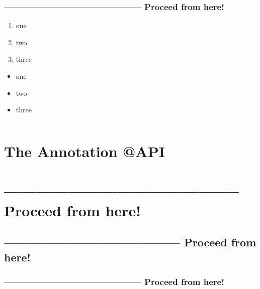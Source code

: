 \subsubsection{-------------------------------------------- Proceed from here!}
\lipsum[1]

\begin{enumerate}[label=P\arabic*.]
\item{one}
\item{two}
\item{three}
\end{enumerate}

\begin{itemize}[nosep]
\item{one}
\item{two}
\item{three}
\end{itemize}

\begin{lstlisting}[numbers=left]
\end{lstlisting}



\section{The Annotation @API}\label{sec:APIAnnotation}
\hrulefill\newpage 
\section{-------------------------------------------- Proceed from here!}
\subsection{-------------------------------------------- Proceed from here!}
\subsubsection{-------------------------------------------- Proceed from here!}
\autocite{APIGUARDIAN}
\autocite{APIGUARDIAN:API}
\lipsum[1]

